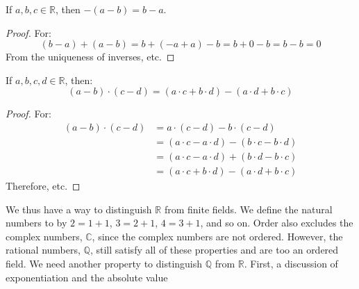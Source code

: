             \begin{theorem}
                If $a,b,c\in\mathbb{R}$, then
                $\minus(a-b)=b-a$.
            \end{theorem}
            \begin{proof}
                For:
                \begin{equation}
                    (b-a)+(a-b)=b+(\minus{a}+a)-b=
                    b+0-b=b-b=0
                \end{equation}
                From the uniqueness of inverses, etc.
            \end{proof}
            \begin{theorem}
                If $a,b,c,d\in\mathbb{R}$, then:
                \begin{equation}
                    (a-b)\cdot(c-d)
                    =(a\cdot{c}+b\cdot{d})-(a\cdot{d}+b\cdot{c})
                \end{equation}
            \end{theorem}
            \begin{proof}
                For:
                \begin{subequations}
                    \begin{align}
                        (a-b)\cdot(c-d)&=
                        a\cdot(c-d)-b\cdot(c-d)\\
                        &=(a\cdot{c}-a\cdot{d})-
                            (b\cdot{c}-b\cdot{d})\\
                        &=(a\cdot{c}-a\cdot{d})+
                            (b\cdot{d}-b\cdot{c})\\
                        &=(a\cdot{c}+b\cdot{d})-
                            (a\cdot{d}+b\cdot{c})
                    \end{align}
                \end{subequations}
                Therefore, etc.
            \end{proof}
            We thus have a way to distinguish $\mathbb{R}$
            from finite fields. We define the natural numbers to by
            $2=1+1$, $3=2+1$, $4=3+1$, and so on. Order also excludes
            the complex numbers, $\mathbb{C}$, since the complex
            numbers are not ordered. However, the rational numbers,
            $\mathbb{Q}$, still satisfy all of these properties and
            are too an ordered field. We need another property to
            distinguish $\mathbb{Q}$ from $\mathbb{R}$. First, a
            discussion of exponentiation and the absolute value
